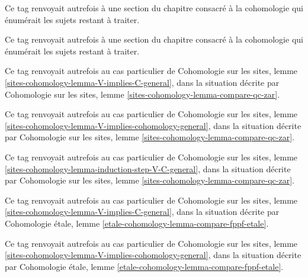 \begin{remark}
\label{remark-cohomology-topics}
Ce tag renvoyait autrefois à une section du chapitre consacré à la
cohomologie qui énumérait les sujets restant à traiter.
\end{remark}

\begin{remark}
\label{remark-sites-cohomology-topics}
Ce tag renvoyait autrefois à une section du chapitre consacré à la
cohomologie qui énumérait les sujets restant à traiter.
\end{remark}

\begin{remark}
\label{remark-V-implies-C}
Ce tag renvoyait autrefois au cas particulier de
Cohomologie sur les sites, lemme
\ref{sites-cohomology-lemma-V-implies-C-general}, dans la situation décrite
par Cohomologie sur les sites, lemme
\ref{sites-cohomology-lemma-compare-qc-zar}.
\end{remark}

\begin{remark}
\label{remark-V-implies-cohomology}
Ce tag renvoyait autrefois au cas particulier de
Cohomologie sur les sites, lemme
\ref{sites-cohomology-lemma-V-implies-cohomology-general}, dans la situation
décrite par Cohomologie sur les sites, lemme
\ref{sites-cohomology-lemma-compare-qc-zar}.
\end{remark}

\begin{remark}
\label{remark-induction-step-V-C}
Ce tag renvoyait autrefois au cas particulier de
Cohomologie sur les sites, lemme
\ref{sites-cohomology-lemma-induction-step-V-C-general}, dans la situation
décrite par Cohomologie sur les sites, lemme
\ref{sites-cohomology-lemma-compare-qc-zar}.
\end{remark}

\begin{remark}
\label{remark-V-implies-C-etale-fppf}
Ce tag renvoyait autrefois au cas particulier de
Cohomologie sur les sites, lemme
\ref{sites-cohomology-lemma-V-implies-C-general}, dans la situation décrite
par Cohomologie étale, lemme
\ref{etale-cohomology-lemma-compare-fppf-etale}.
\end{remark}

\begin{remark}
\label{remark-V-implies-cohomology-etale-fppf}
Ce tag renvoyait autrefois au cas particulier de
Cohomologie sur les sites, lemme
\ref{sites-cohomology-lemma-V-implies-cohomology-general}, dans la situation
décrite par Cohomologie étale, lemme
\ref{etale-cohomology-lemma-compare-fppf-etale}.
\end{remark}

